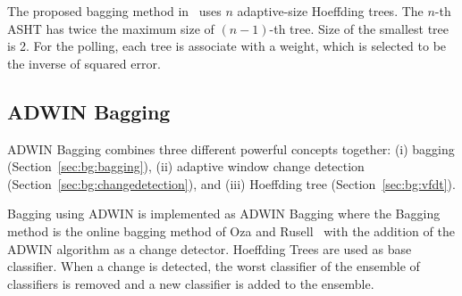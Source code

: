 The proposed bagging method in~\cite{bifet09:asht} uses $n$ adaptive-size Hoeffding trees. The $n$-th ASHT has twice the maximum size of $(n-1)$-th tree. Size of the smallest tree is 2. For the polling, each tree is associate with a weight, which is selected to be the inverse of squared error.

\subsection{ADWIN Bagging}
ADWIN Bagging combines three different powerful concepts together: (i) bagging (Section~\ref{sec:bg:bagging}), (ii) adaptive window change detection (Section~\ref{sec:bg:changedetection}), and (iii) Hoeffding tree (Section~\ref{sec:bg:vfdt}).

Bagging using ADWIN is implemented as ADWIN Bagging where the Bagging method is the online bagging method of Oza and Rusell~\cite{oza01:obagboost} with the addition of the ADWIN algorithm as a change detector. Hoeffding Trees are used as base classifier. When a change is detected, the worst classifier of the ensemble of classifiers is removed and a new classifier is added to the ensemble. 
